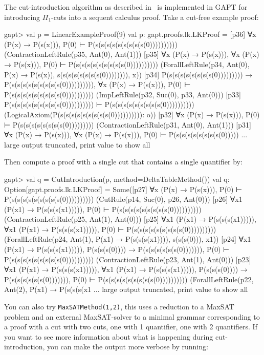 \documentclass[a4paper,11pt]{book}
\begin{document}
The cut-introduction algorithm as described in~\cite{Hetzl2012,Hetzl14Algorithmic,Hetzl14Introducing} is
implemented in GAPT for introducing $\Pi_1$-cuts into a sequent calculus
proof. Take a cut-free example proof:
\begin{clilisting}
  gapt> val p = LinearExampleProof(9)
  val p: gapt.proofs.lk.LKProof = [p36] ∀x (P(x) → P(s(x))), P(0) ⊢ P(s(s(s(s(s(s(s(s(s(0))))))))))    (ContractionLeftRule(p35, Ant(0), Ant(1)))
  [p35] ∀x (P(x) → P(s(x))), ∀x (P(x) → P(s(x))), P(0) ⊢ P(s(s(s(s(s(s(s(s(s(0))))))))))    (ForallLeftRule(p34, Ant(0), P(x) → P(s(x)), s(s(s(s(s(s(s(s(0)))))))), x))
  [p34] P(s(s(s(s(s(s(s(s(0))))))))) → P(s(s(s(s(s(s(s(s(s(0)))))))))),
  ∀x (P(x) → P(s(x))),
  P(0)
  ⊢
  P(s(s(s(s(s(s(s(s(s(0))))))))))    (ImpLeftRule(p32, Suc(0), p33, Ant(0)))
  [p33] P(s(s(s(s(s(s(s(s(s(0)))))))))) ⊢ P(s(s(s(s(s(s(s(s(s(0))))))))))    (LogicalAxiom(P(s(s(s(s(s(s(s(s(s(0)))))))))): o))
  [p32] ∀x (P(x) → P(s(x))), P(0) ⊢ P(s(s(s(s(s(s(s(s(0)))))))))    (ContractionLeftRule(p31, Ant(0), Ant(1)))
  [p31] ∀x (P(x) → P(s(x))), ∀x (P(x) → P(s(x))), P(0) ⊢ P(s(s(s(s(s(s(s(s(0))))) ... large output truncated, print value to show all

\end{clilisting}
Then compute a proof with a single cut that contains a single quantifier by:
\begin{clilisting}
  gapt> val q = CutIntroduction(p, method=DeltaTableMethod())
  val q: Option[gapt.proofs.lk.LKProof] = Some([p27] ∀x (P(x) → P(s(x))), P(0) ⊢ P(s(s(s(s(s(s(s(s(s(0))))))))))    (CutRule(p14, Suc(0), p26, Ant(0)))
  [p26] ∀x1 (P(x1) → P(s(s(s(x1))))), P(0) ⊢ P(s(s(s(s(s(s(s(s(s(0))))))))))    (ContractionLeftRule(p25, Ant(1), Ant(0)))
  [p25] ∀x1 (P(x1) → P(s(s(s(x1))))),
  ∀x1 (P(x1) → P(s(s(s(x1))))),
  P(0)
  ⊢
  P(s(s(s(s(s(s(s(s(s(0))))))))))    (ForallLeftRule(p24, Ant(1), P(x1) → P(s(s(s(x1)))), s(s(s(0))), x1))
  [p24] ∀x1 (P(x1) → P(s(s(s(x1))))),
  P(s(s(s(0)))) → P(s(s(s(s(s(s(0))))))),
  P(0)
  ⊢
  P(s(s(s(s(s(s(s(s(s(0))))))))))    (ContractionLeftRule(p23, Ant(1), Ant(0)))
  [p23] ∀x1 (P(x1) → P(s(s(s(x1))))),
  ∀x1 (P(x1) → P(s(s(s(x1))))),
  P(s(s(s(0)))) → P(s(s(s(s(s(s(0))))))),
  P(0)
  ⊢
  P(s(s(s(s(s(s(s(s(s(0))))))))))    (ForallLeftRule(p22, Ant(2), P(x1) → P(s(s(s(x1 ... large output truncated, print value to show all

\end{clilisting}

You can also try \texttt{MaxSATMethod(1,2)}, this uses a reduction to a MaxSAT
problem and an external MaxSAT-solver to a
minimal grammar corresponding to a proof with a cut with two cuts, one with 1
quantifier, one with 2 quantifiers.  If you want to see more information
about what is happening during cut-introduction, you can make the output more
verbose by running:
\end{document}
